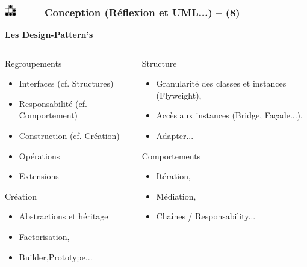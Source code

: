 \documentclass[slidetop,11pt]{beamer}
\def\sectionPartIaUN{Conception (R{\'e}flexion et UML...) -- }
\def\moreInFrameTitle{\includegraphics[height=0.5cm]{img/logo_glider.png}~~~~~}
\begin{document}
\begin{frame}
	\frametitle{\moreInFrameTitle \sectionPartIaUN (8)}
	\textbf{\large{Les Design-Pattern's}}
	\begin{columns}[c]
		\begin{column}[c]{5cm}
			\begin{exampleblock}{Regroupements}
			\begin{itemize}
				\item Interfaces (cf. Structures)
				\item Responsabilit{\'e} (cf. Comportement)
				\item Construction (cf. Cr{\'e}ation)
				\item Op{\'e}rations
				\item Extensions
			\end{itemize}
			\end{exampleblock}
			\begin{alertblock}{Cr{\'e}ation}
			\begin{itemize}
				\item Abstractions et h{\'e}ritage
				\item Factorisation, 
				\item Builder,Prototype...
			\end{itemize}
			\end{alertblock}
		\end{column}
		\begin{column}[c]{5cm}
			\begin{alertblock}{Structure}
			\begin{itemize}
				\item Granularit{\'e} des classes et instances (Flyweight),
				\item Acc{\`e}s aux instances (Bridge, Fa\c{c}ade...),
				\item Adapter...
			\end{itemize}
			\end{alertblock}
			
			\begin{exampleblock}{Comportements}
			\begin{itemize}
				\item It{\'e}ration, 
				\item M{\'e}diation, 
				\item Cha{\^i}nes / Responsability...
			\end{itemize}
			\end{exampleblock}
		\end{column}
	\end{columns}
\end{frame} 
\end{document}
